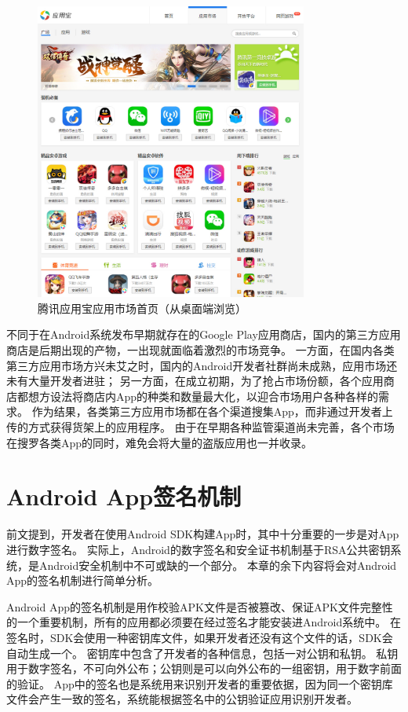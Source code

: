 \begin{figure}
	\centering
	\includegraphics[width=0.8\textwidth]{./Figures/edwin-yyb.jpg}
	\caption{腾讯应用宝应用市场首页（从桌面端浏览）}
	\label{fig:mkt-yyb}
\end{figure}

不同于在Android系统发布早期就存在的Google Play应用商店，国内的第三方应用商店是后期出现的产物，一出现就面临着激烈的市场竞争。
一方面，在国内各类第三方应用市场方兴未艾之时，国内的Android开发者社群尚未成熟，应用市场还未有大量开发者进驻；
另一方面，在成立初期，为了抢占市场份额，各个应用商店都想方设法将商店内App的种类和数量最大化，以迎合市场用户各种各样的需求。
作为结果，各类第三方应用市场都在各个渠道搜集App，而非通过开发者上传的方式获得货架上的应用程序。
由于在早期各种监管渠道尚未完善，各个市场在搜罗各类App的同时，难免会将大量的盗版应用也一并收录。

\section{Android App签名机制}

前文提到，开发者在使用Android SDK构建App时，其中十分重要的一步是对App进行数字签名。
实际上，Android的数字签名和安全证书机制基于RSA公共密钥系统，是Android安全机制中不可或缺的一个部分。
本章的余下内容将会对Android App的签名机制进行简单分析。

Android App的签名机制是用作校验APK文件是否被篡改、保证APK文件完整性的一个重要机制，所有的应用都必须要在经过签名才能安装进Android系统中。
在签名时，SDK会使用一种密钥库文件，如果开发者还没有这个文件的话，SDK会自动生成一个。
密钥库中包含了开发者的各种信息，包括一对公钥和私钥。
私钥用于数字签名，不可向外公布；公钥则是可以向外公布的一组密钥，用于数字前面的验证。
App中的签名也是系统用来识别开发者的重要依据，因为同一个密钥库文件会产生一致的签名，系统能根据签名中的公钥验证应用识别开发者。

